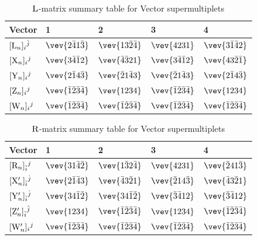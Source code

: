 \documentclass[12pt]{article}
\def\rL{{\rm L}}
\def\rR{{\rm R}}
\let\bm\relax
\newcommand{\bm}[1]{{\boldsymbol{#1}}}
\begin{document}
\begin{table}[H]
\setlength\extrarowheight{2pt}
\begin{center}
\begin{tabular}{|m{2.8em}|m{3.2cm}|m{3.2cm}|m{3.2cm}|m{3.2cm}|}
\hline
Vector &  1&  2& 3& 4\\ 
\hline
$[{\bm \rL}_n]_{i}{}^{\hat j}$& 
$\vev{2\bar41\bar3}$&
$\vev{13\bar2\bar4}$&
$\vev{4231}$&
$\vev{3\bar1\bar42}$\\
\hline
$[{\bm{\rm X}}_n]_{i}{}^{j}$ &  
$\vev{3\bar4\bar12}$&
$\vev{\bar4\bar321}$&
$\vev{3\bar4\bar12}$& 
$\vev{43\bar2\bar1}$\\ 
\hline
$[{\bm{\rm Y}}_n]_{i}{}^{j}$ &  
$\vev{2\bar14\bar3}$&  
$\vev{\bar21\bar43}$&  
$\vev{\bar21\bar43}$&
$\vev{2\bar14\bar3}$\\ 
\hline
$[{\bm{\rm Z}}_n]_{i}{}^{j}$&  
$\vev{\bar1\bar2\bar3\bar4}$&  
$\vev{1234}$&  
$\vev{\bar1\bar2\bar3\bar4}$&
$\vev{1234}$\\ 
\hline
$[{\bm{\rm W}}_n]_{i}{}^{j}$ &  
$\vev{\bar1\bar2\bar3\bar4}$&  
$\vev{\bar1\bar2\bar3\bar4}$&  
$\vev{\bar1\bar2\bar3\bar4}$&
$\vev{\bar1\bar2\bar3\bar4}$\\ 
\hline
\end{tabular}
\end{center}
\caption{$\bm\rL$-matrix summary table for Vector supermultiplets}
\label{tab3a}
\end{table}

\begin{table}[H]
\setlength\extrarowheight{2pt}
\begin{center}
\begin{tabular}{|m{2.8em}|m{3.2cm}|m{3.2cm}|m{3.2cm}|m{3.2cm}|}
\hline
Vector &  1&  2& 3& 4\\ 
\hline
$[{\bm{\rm R}}_n]_{\hat i}{}^{j}$& 
$\vev{31\bar4\bar2}$& 
$\vev{1\bar32\bar4}$& 
$\vev{4231}$& 
$\vev{\bar241\bar3}$\\   
\hline
$[{\bm{\rm X}}'_n]_{\hat i}{}^{\hat j}$ &  
$\vev{2\bar1\bar43}$&
$\vev{\bar43\bar21}$&
$\vev{\bar214\bar3}$& 
$\vev{\bar43\bar21}$\\
\hline
$[{\bm{\rm Y}}'_n]_{\hat i}{}^{\hat j}$ &  
$\vev{34\bar1\bar2}$&  
$\vev{34\bar1\bar2}$&  
$\vev{\bar3\bar412}$& 
$\vev{\bar3\bar412}$\\ 
\hline
$[{\bm{\rm Z}}'_n]_{\hat i}{}^{\hat j}$ &  
$\vev{1234}$&  
$\vev{\bar1\bar2\bar3\bar4}$&  
$\vev{1234}$&
$\vev{\bar1\bar2\bar3\bar4}$\\ 
\hline
$[{\bm{\rm W}}'_n]_{i}{}^{j}$ &  
$\vev{\bar1\bar2\bar3\bar4}$&  
$\vev{\bar1\bar2\bar3\bar4}$&  
$\vev{\bar1\bar2\bar3\bar4}$&
$\vev{\bar1\bar2\bar3\bar4}$\\ 
\hline
\end{tabular}
\end{center}
\caption{$\bm\rR$-matrix summary table for Vector supermultiplets}
\label{tab4a}
\end{table}
\end{document}

